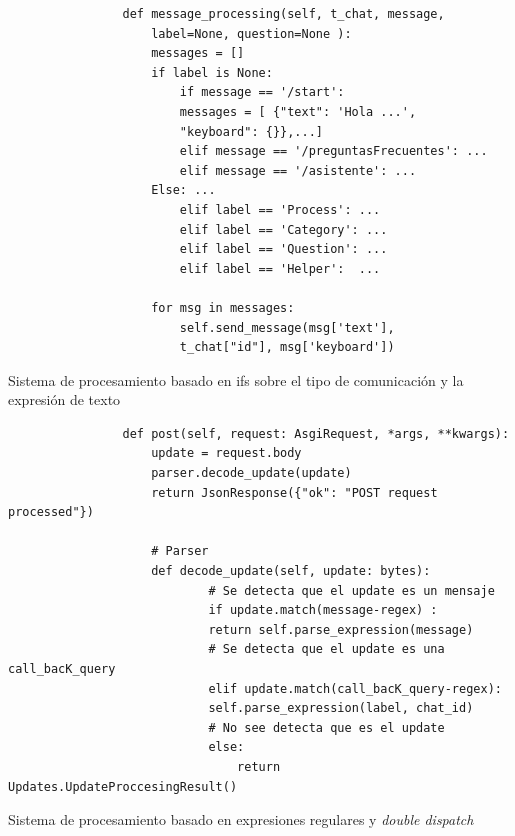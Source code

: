         \begin{listing}
            \begin{verbatim}
                def message_processing(self, t_chat, message, 
                    label=None, question=None ):
                    messages = []
                    if label is None:
                        if message == '/start':
                        messages = [ {"text": 'Hola ...',
                        "keyboard": {}},...]
                        elif message == '/preguntasFrecuentes': ...
                        elif message == '/asistente': ... 
                    Else: ...
                        elif label == 'Process': ...
                        elif label == 'Category': ...
                        elif label == 'Question': ...
                        elif label == 'Helper':  ...
                    
                    for msg in messages:
                        self.send_message(msg['text'],
                        t_chat["id"], msg['keyboard'])
            \end{verbatim}
             \caption[sistema de procesamiento anterior]{Sistema de procesamiento basado en ifs sobre el tipo de comunicación y la expresión de texto}
        \end{listing}

        \begin{listing}
            \begin{verbatim}
                def post(self, request: AsgiRequest, *args, **kwargs):
                    update = request.body
                    parser.decode_update(update)
                    return JsonResponse({"ok": "POST request processed"})
                
                    # Parser
                    def decode_update(self, update: bytes):
                            # Se detecta que el update es un mensaje
                            if update.match(message-regex) :
                            return self.parse_expression(message)
                            # Se detecta que el update es una call_bacK_query
                            elif update.match(call_bacK_query-regex):
                            self.parse_expression(label, chat_id)
                            # No see detecta que es el update
                            else:
                                return Updates.UpdateProccesingResult()
            \end{verbatim}
            \caption[Nuevo Sistema de Procesamiento]{Sistema de procesamiento basado en expresiones regulares y \textit{double dispatch}}
        \end{listing}


